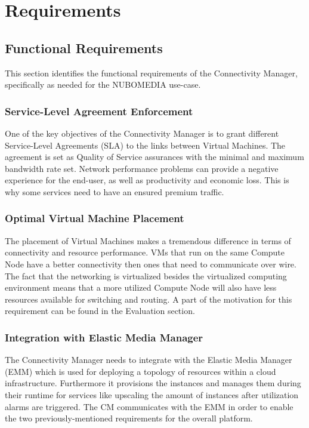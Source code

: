 \chapter{Requirements}

\section{Functional Requirements}

This section identifies the functional requirements of the Connectivity Manager, specifically as needed for the NUBOMEDIA use-case.

\subsection{Service-Level Agreement Enforcement}

One of the key objectives of the Connectivity Manager is to grant different Service-Level Agreements (SLA) to the links between Virtual Machines. The agreement is set as Quality of Service assurances with the minimal and maximum bandwidth rate set. Network performance problems can provide a negative experience for the end-user, as well as productivity and economic loss. This is why some services need to have an ensured premium traffic.

\subsection{Optimal Virtual Machine Placement}

The placement of Virtual Machines makes a tremendous difference in terms of connectivity and resource performance. VMs that run on the same Compute Node have a better connectivity then ones that need to communicate over wire. The fact that the networking is virtualized besides the virtualized computing environment means that a more utilized Compute Node will also have less resources available for switching and routing. A part of the motivation for this requirement can be found in the Evaluation section.

\subsection{Integration with Elastic Media Manager}

The Connectivity Manager needs to integrate with the Elastic Media Manager (EMM) which is used for deploying a topology of resources within a cloud infrastructure. Furthermore it provisions the instances and manages them during their runtime for services like upscaling the amount of instances after utilization alarms are triggered. The CM communicates with the EMM in order to enable the two previously-mentioned requirements for the overall platform.

